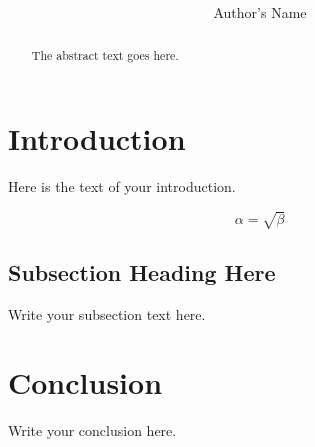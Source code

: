 \documentclass[12pt]{article}
\begin{document}
\title{ }
\author{Author's Name}

\maketitle

\begin{abstract}
The abstract text goes here.
\end{abstract}

\section{Introduction}
Here is the text of your introduction.

\begin{equation}
    \label{simple_equation}
    \alpha = \sqrt{ \beta }
\end{equation}

\subsection{Subsection Heading Here}
Write your subsection text here.

\section{Conclusion}
Write your conclusion here.

\end{document}
